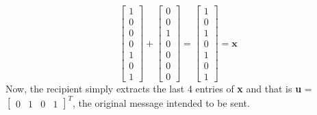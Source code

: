 \documentclass[11pt,a4paper]{article}
\begin{document}
$$
\begin{bmatrix}
    1\\
    0\\
    0\\
    0\\
    1\\
    0\\
    1
\end{bmatrix}
+
\begin{bmatrix}
    0\\
    0\\
    1\\
    0\\
    0\\
    0\\
    0
\end{bmatrix}
= 
\begin{bmatrix}
    1\\
    0\\
    1\\
    0\\
    1\\
    0\\
    1
\end{bmatrix}
= \mathbf{x}
$$
Now, the recipient simply extracts the last 4 entries of \textbf{x} and that is \textbf{u} = $\begin{bmatrix}
    0 & 1 & 0 & 1
\end{bmatrix}^T$, the original message intended to be sent.
\end{document}
